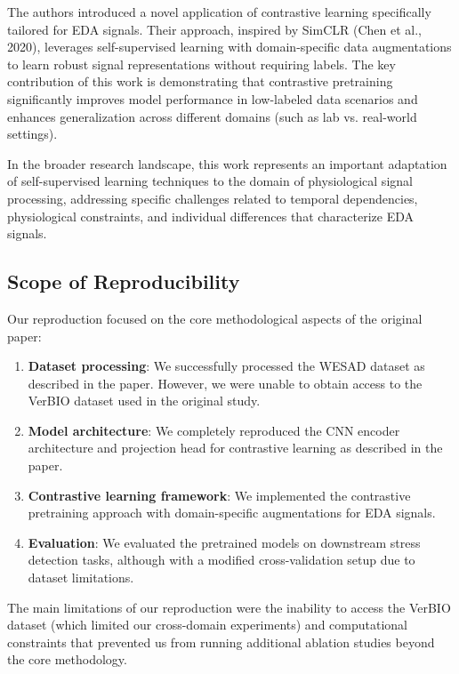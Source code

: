 \documentclass[10pt,letterpaper,twocolumn]{article}
\begin{document}
The authors introduced a novel application of contrastive learning specifically tailored for EDA signals. Their approach, inspired by SimCLR (Chen et al., 2020), leverages self-supervised learning with domain-specific data augmentations to learn robust signal representations without requiring labels. The key contribution of this work is demonstrating that contrastive pretraining significantly improves model performance in low-labeled data scenarios and enhances generalization across different domains (such as lab vs. real-world settings).

In the broader research landscape, this work represents an important adaptation of self-supervised learning techniques to the domain of physiological signal processing, addressing specific challenges related to temporal dependencies, physiological constraints, and individual differences that characterize EDA signals.

\subsection{Scope of Reproducibility}

Our reproduction focused on the core methodological aspects of the original paper:

\begin{enumerate}
    \item \textbf{Dataset processing}: We successfully processed the WESAD dataset as described in the paper. However, we were unable to obtain access to the VerBIO dataset used in the original study.
    
    \item \textbf{Model architecture}: We completely reproduced the CNN encoder architecture and projection head for contrastive learning as described in the paper.
    
    \item \textbf{Contrastive learning framework}: We implemented the contrastive pretraining approach with domain-specific augmentations for EDA signals.
    
    \item \textbf{Evaluation}: We evaluated the pretrained models on downstream stress detection tasks, although with a modified cross-validation setup due to dataset limitations.
\end{enumerate}

The main limitations of our reproduction were the inability to access the VerBIO dataset (which limited our cross-domain experiments) and computational constraints that prevented us from running additional ablation studies beyond the core methodology.
\end{document}
